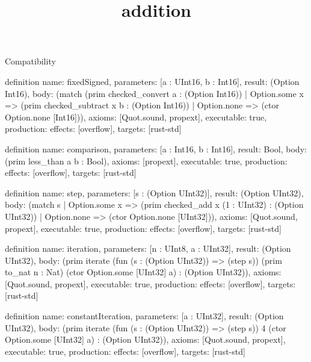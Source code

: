 \begin{lexlean}{Compatibility}
\title{addition}
\begin{semanticmodule}
definition{
  name: fixedSigned,
  parameters: [a : UInt16, b : Int16],
  result: (Option Int16),
  body: (match (prim checked_convert a : (Option Int16))
    | Option.some x => (prim checked_subtract x b : (Option Int16))
    | Option.none => (ctor Option.none [Int16])),
  axioms: [Quot.sound, propext],
  executable: true,
  production: {effects: [overflow], targets: [rust-std]}
}

definition{
  name: comparison,
  parameters: [a : Int16, b : Int16],
  result: Bool,
  body: (prim less_than a b : Bool),
  axioms: [propext],
  executable: true,
  production: {effects: [overflow], targets: [rust-std]}
}

definition{
  name: step,
  parameters: [s : (Option UInt32)],
  result: (Option UInt32),
  body: (match s
    | Option.some x => (prim checked_add x (1 : UInt32) : (Option UInt32))
    | Option.none => (ctor Option.none [UInt32])),
  axioms: [Quot.sound, propext],
  executable: true,
  production: {effects: [overflow], targets: [rust-std]}
}

definition{
  name: iteration,
  parameters: [n : UInt8, a : UInt32],
  result: (Option UInt32),
  body: (prim iterate (fun (s : (Option UInt32)) => (step s)) (prim to_nat n : Nat) (ctor Option.some [UInt32] a) : (Option UInt32)),
  axioms: [Quot.sound, propext],
  executable: true,
  production: {effects: [overflow], targets: [rust-std]}
}

definition{
  name: constantIteration,
  parameters: [a : UInt32],
  result: (Option UInt32),
  body: (prim iterate (fun (s : (Option UInt32)) => (step s)) 4 (ctor Option.some [UInt32] a) : (Option UInt32)),
  axioms: [Quot.sound, propext],
  executable: true,
  production: {effects: [overflow], targets: [rust-std]}
}
\end{semanticmodule}
\end{lexlean}

